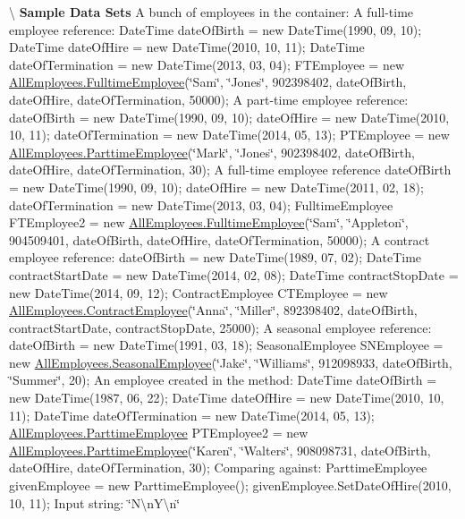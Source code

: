 \textbackslash{} {\bfseries  Sample Data Sets} A bunch of employees in the container\+: A full-\/time employee reference\+: Date\+Time date\+Of\+Birth = new Date\+Time(1990, 09, 10); Date\+Time date\+Of\+Hire = new Date\+Time(2010, 10, 11); Date\+Time date\+Of\+Termination = new Date\+Time(2013, 03, 04); F\+T\+Employee = new \hyperlink{class_all_employees_1_1_fulltime_employee}{All\+Employees.\+Fulltime\+Employee}(\char`\"{}\+Sam\char`\"{}, \char`\"{}\+Jones\char`\"{}, 902398402, date\+Of\+Birth, date\+Of\+Hire, date\+Of\+Termination, 50000); A part-\/time employee reference\+: date\+Of\+Birth = new Date\+Time(1990, 09, 10); date\+Of\+Hire = new Date\+Time(2010, 10, 11); date\+Of\+Termination = new Date\+Time(2014, 05, 13); P\+T\+Employee = new \hyperlink{class_all_employees_1_1_parttime_employee}{All\+Employees.\+Parttime\+Employee}(\char`\"{}\+Mark\char`\"{}, \char`\"{}\+Jones\char`\"{}, 902398402, date\+Of\+Birth, date\+Of\+Hire, date\+Of\+Termination, 30); A full-\/time employee reference date\+Of\+Birth = new Date\+Time(1990, 09, 10); date\+Of\+Hire = new Date\+Time(2011, 02, 18); date\+Of\+Termination = new Date\+Time(2013, 03, 04); Fulltime\+Employee F\+T\+Employee2 = new \hyperlink{class_all_employees_1_1_fulltime_employee}{All\+Employees.\+Fulltime\+Employee}(\char`\"{}\+Sam\char`\"{}, \char`\"{}\+Appleton\char`\"{}, 904509401, date\+Of\+Birth, date\+Of\+Hire, date\+Of\+Termination, 50000); A contract employee reference\+: date\+Of\+Birth = new Date\+Time(1989, 07, 02); Date\+Time contract\+Start\+Date = new Date\+Time(2014, 02, 08); Date\+Time contract\+Stop\+Date = new Date\+Time(2014, 09, 12); Contract\+Employee C\+T\+Employee = new \hyperlink{class_all_employees_1_1_contract_employee}{All\+Employees.\+Contract\+Employee}(\char`\"{}\+Anna\char`\"{}, \char`\"{}\+Miller\char`\"{}, 892398402, date\+Of\+Birth, contract\+Start\+Date, contract\+Stop\+Date, 25000); A seasonal employee reference\+: date\+Of\+Birth = new Date\+Time(1991, 03, 18); Seasonal\+Employee S\+N\+Employee = new \hyperlink{class_all_employees_1_1_seasonal_employee}{All\+Employees.\+Seasonal\+Employee}(\char`\"{}\+Jake\char`\"{}, \char`\"{}\+Williams\char`\"{}, 912098933, date\+Of\+Birth, \char`\"{}\+Summer\char`\"{}, 20); An employee created in the method\+: Date\+Time date\+Of\+Birth = new Date\+Time(1987, 06, 22); Date\+Time date\+Of\+Hire = new Date\+Time(2010, 10, 11); Date\+Time date\+Of\+Termination = new Date\+Time(2014, 05, 13); \hyperlink{class_all_employees_1_1_parttime_employee}{All\+Employees.\+Parttime\+Employee} P\+T\+Employee2 = new \hyperlink{class_all_employees_1_1_parttime_employee}{All\+Employees.\+Parttime\+Employee}(\char`\"{}\+Karen\char`\"{}, \char`\"{}\+Walters\char`\"{}, 908098731, date\+Of\+Birth, date\+Of\+Hire, date\+Of\+Termination, 30); Comparing against\+: Parttime\+Employee given\+Employee = new Parttime\+Employee(); given\+Employee.\+Set\+Date\+Of\+Hire(2010, 10, 11); Input string\+: \char`\"{}\+N\textbackslash{}n\+Y\textbackslash{}n\char`\"{}

